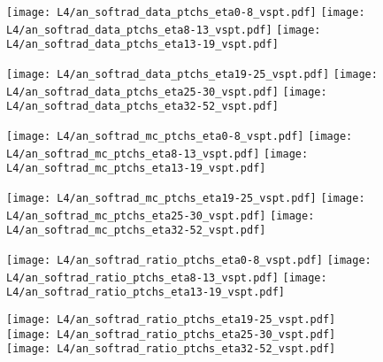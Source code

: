 \documentclass[landscape,10pt]{beamer} %
\begin{document}
{\newpage

\begin{figure}[p]
\centering
  \texttt{[image: L4/an\_softrad\_data\_ptchs\_eta0-8\_vspt.pdf]}
  \texttt{[image: L4/an\_softrad\_data\_ptchs\_eta8-13\_vspt.pdf]}
  \texttt{[image: L4/an\_softrad\_data\_ptchs\_eta13-19\_vspt.pdf]}
\end{figure}
\begin{figure}[p]
\centering
  \texttt{[image: L4/an\_softrad\_data\_ptchs\_eta19-25\_vspt.pdf]}
  \texttt{[image: L4/an\_softrad\_data\_ptchs\_eta25-30\_vspt.pdf]}
  \texttt{[image: L4/an\_softrad\_data\_ptchs\_eta32-52\_vspt.pdf]}
\end{figure}

\newpage

\newpage

\begin{figure}[p]
\centering
  \texttt{[image: L4/an\_softrad\_mc\_ptchs\_eta0-8\_vspt.pdf]}
  \texttt{[image: L4/an\_softrad\_mc\_ptchs\_eta8-13\_vspt.pdf]}
  \texttt{[image: L4/an\_softrad\_mc\_ptchs\_eta13-19\_vspt.pdf]}
\end{figure}
\begin{figure}[p]
\centering
  \texttt{[image: L4/an\_softrad\_mc\_ptchs\_eta19-25\_vspt.pdf]}
  \texttt{[image: L4/an\_softrad\_mc\_ptchs\_eta25-30\_vspt.pdf]}
  \texttt{[image: L4/an\_softrad\_mc\_ptchs\_eta32-52\_vspt.pdf]}
\end{figure}

\newpage

\begin{figure}[p]
\centering
  \texttt{[image: L4/an\_softrad\_ratio\_ptchs\_eta0-8\_vspt.pdf]}
  \texttt{[image: L4/an\_softrad\_ratio\_ptchs\_eta8-13\_vspt.pdf]}
  \texttt{[image: L4/an\_softrad\_ratio\_ptchs\_eta13-19\_vspt.pdf]}
\end{figure}
\begin{figure}[p]
\centering
  \texttt{[image: L4/an\_softrad\_ratio\_ptchs\_eta19-25\_vspt.pdf]}
  \texttt{[image: L4/an\_softrad\_ratio\_ptchs\_eta25-30\_vspt.pdf]}
  \texttt{[image: L4/an\_softrad\_ratio\_ptchs\_eta32-52\_vspt.pdf]}
\end{figure}

\newpage

} %
\end{document}
